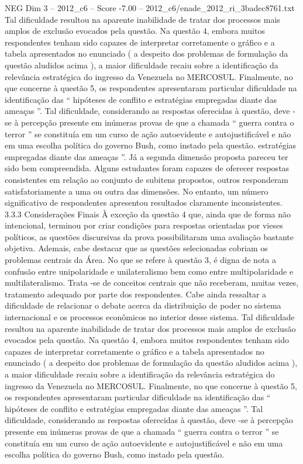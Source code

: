 \begin{textsample}{NEG Dim 3 – 2012\_c6 – Score -7.00 – 2012\_c6/enade\_2012\_ri\_3badec8761.txt}
Tal dificuldade resultou na aparente inabilidade de tratar dos processos mais amplos de exclusão evocados pela questão.
Na questão 4, embora muitos respondentes tenham sido capazes de interpretar corretamente o gráfico e a tabela apresentados no enunciado ( a despeito dos problemas de formulação da questão aludidos acima ), a maior dificuldade recaiu sobre a identificação da relevância estratégica do ingresso da Venezuela no MERCOSUL.
Finalmente, no que concerne à questão 5, os respondentes apresentaram particular dificuldade na identificação das “ hipóteses de conflito e estratégias empregadas diante das ameaças ”.
Tal dificuldade, considerando as respostas oferecidas à questão, deve -se à percepção presente em inúmeras provas de que a chamada “ guerra contra o terror ” se constituía em um curso de ação autoevidente e autojustificável e não em uma escolha política do governo Bush, como instado pela questão. estratégias empregadas diante das ameaças ”.
Já a segunda dimensão proposta pareceu ter sido bem compreendida.
Alguns estudantes foram capazes de oferecer respostas consistentes em relação ao conjunto de subitens propostos, outros responderam satisfatoriamente a uma ou outra das dimensões.
No entanto, um número significativo de respondentes apresentou resultados claramente inconsistentes. 3.3.3 Considerações Finais À exceção da questão 4 que, ainda que de forma não intencional, terminou por criar condições para respostas orientadas por vieses políticos, as questões discursivas da prova possibilitaram uma avaliação bastante objetiva.
Ademais, cabe destacar que as questões selecionadas cobriam os problemas centrais da Área.
No que se refere à questão 3, é digna de nota a confusão entre unipolaridade e unilateralismo bem como entre multipolaridade e multilateralismo.
Trata -se de conceitos centrais que não receberam, muitas vezes, tratamento adequado por parte dos respondentes.
Cabe ainda ressaltar a dificuldade de relacionar o debate acerca da distribuição de poder no sistema internacional e os processos econômicos no interior desse sistema.
Tal dificuldade resultou na aparente inabilidade de tratar dos processos mais amplos de exclusão evocados pela questão.
Na questão 4, embora muitos respondentes tenham sido capazes de interpretar corretamente o gráfico e a tabela apresentados no enunciado ( a despeito dos problemas de formulação da questão aludidos acima ), a maior dificuldade recaiu sobre a identificação da relevância estratégica do ingresso da Venezuela no MERCOSUL.
Finalmente, no que concerne à questão 5, os respondentes apresentaram particular dificuldade na identificação das “ hipóteses de conflito e estratégias empregadas diante das ameaças ”.
Tal dificuldade, considerando as respostas oferecidas à questão, deve -se à percepção presente em inúmeras provas de que a chamada “ guerra contra o terror ” se constituía em um curso de ação autoevidente e autojustificável e não em uma escolha política do governo Bush, como instado pela questão.

\end{textsample}
